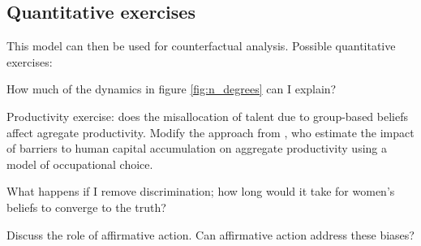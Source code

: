 \documentclass[11 pt]{article}
\newcommand{\toedit}[1]{{\color{gray}#1}}
\newcommand{\toedit}[1]{#1}
\begin{document}






% 

\subsection{Quantitative exercises}

\toedit{
This model can then be used for counterfactual analysis. Possible quantitative exercises:
\begin{outline}
\item How much of the dynamics in figure \ref{fig:n_degrees} can I explain? 

\item Productivity exercise: does the misallocation of talent due to group-based beliefs affect agregate productivity. Modify the approach from \textcite{HHJK19}, who estimate the impact of barriers to human capital accumulation on aggregate productivity using a \textcite{R51} model of occupational choice. 
%
%
% 
\item What happens if I remove discrimination; how long would it take for women's beliefs to converge to the truth?

\item Discuss the role of affirmative action. Can affirmative action address these biases?
\end{outline}

} %


% 


\printbibliography
\end{document}
